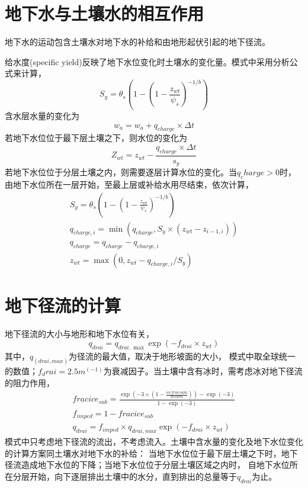 \section{地下水与土壤水的相互作用}
地下水的运动包含土壤水对地下水的补给和由地形起伏引起的地下径流。


给水度(specific yield)反映了地下水位变化时土壤水的变化量。模式中采用分析公式来计算，
\begin{equation}
{S}_{{y}}=\theta_{s}\left(1-\left(1-\frac{z_{w t}}{\psi_{s}}\right)^{-1 / b}\right)
\end{equation}
含水层水量的变化为
\begin{equation}
w_{a}=w_{a}+q_{charge} \times \Delta t
\end{equation}
若地下水位位于最下层土壤之下，则水位的变化为
\begin{equation}
Z_{w t}=z_{w t}-\frac{q_{charge} \times \Delta t}{s_{y}}
\end{equation}
若地下水位位于分层土壤之内，则需要逐层计算水位的变化。当$q_charge>0$时，
由地下水位所在一层开始，至最上层或补给水用尽结束，依次计算，
\begin{equation}
\begin{array}{c}{S}_{{y}}=\theta_{s}\left(1-\left(1-\frac{z_{w t}}{\psi_{s}}\right)^{-1 / b}\right) \\
     q_{ {charge }, i}=\min \left(q_{ {charge }}, S_{y} \times \left(z_{w t}-z_{i-1, i}\right)\right) \\
      q_{ {charge }}=q_{ {charge }}-q_{ {charge }, i} \\ 
      z_{w t}=\max \left(0, z_{w t}-q_{ {charge }, i} / S_{y}\right)\end{array}
\end{equation}


\section{地下径流的计算}
地下径流的大小与地形和地下水位有关，
\begin{equation}
{q}_{{drai}}=q_{d r a i, \max } \exp \left(-f_{d r a i} \times z_{w t}\right)
\end{equation}
其中，$q_(drai,max)$为径流的最大值，取决于地形坡面的大小，
模式中取全球统一的数值；$f_drai=2.5m^(-1)$为衰减因子。当土壤中含有冰时，需考虑冰对地下径流的阻力作用，
\begin{equation}
\begin{array}{c} { fracice }_{ {sub }}=\frac{\exp \left(-3 \times\left(1-\frac{i c e f r a c s u m}{d z s u m}\right)\right)
    -\exp (-3)}{1-\exp (-3)} \\ f_{ {imped }}=1- { fracice }_{s u b} \\ {q}_{{drai}}=f_{ {imped }} \times q_{ {drai,max }} 
    \exp \left(-f_{d r a i} \times z_{w t}\right)\end{array}
\end{equation}
模式中只考虑地下径流的流出，不考虑流入。土壤中含水量的变化及地下水位变化的计算方案同土壤水对地下水的补给：
当地下水位位于最下层土壤之下时，地下径流造成地下水位的下降；当地下水位位于分层土壤区域之内时，
自地下水位所在分层开始，向下逐层排出土壤中的水分，直到排出的总量等于$q_{drai}$为止。


